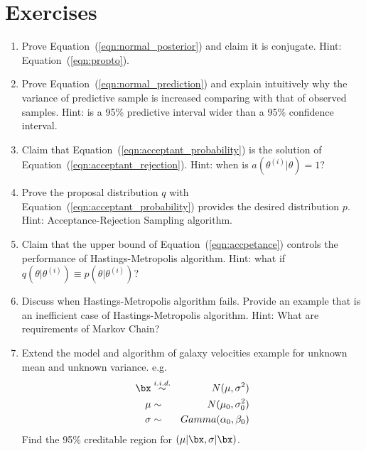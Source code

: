 \section{Exercises}
\label{sec:bayes_exercise}

\begin{enumerate}[label=\thechapter-\arabic*]

\item
Prove Equation~(\ref{eqn:normal_posterior}) and claim it is conjugate.
{\color{blue} Hint: Equation~(\ref{eqn:propto}). }

\item
Prove Equation~(\ref{eqn:normal_prediction}) and explain intuitively why
the variance of predictive sample is increased comparing with that of
observed samples.
{\color{blue} Hint: is a 95\% predictive interval wider than a 95\% confidence
interval. }

\item
Claim that Equation~(\ref{eqn:acceptant_probability}) is the solution of
Equation~(\ref{eqn:acceptant_rejection}).
{\color{blue} Hint: when is $a(\theta^{(i)} | \theta) = 1$? }

\item
Prove the proposal distribution $q$ with
Equation~(\ref{eqn:acceptant_probability}) provides the desired
distribution $p$.
{\color{blue} Hint: Acceptance-Rejection Sampling algorithm. }

\item
Claim that the upper bound of Equation~(\ref{eqn:accpetance}) controls
the performance of Hastings-Metropolis algorithm.
{\color{blue} Hint: what if
$q(\theta | \theta^{(i)}) \equiv p(\theta | \theta^{(i)})$? }

\item
Discuss when Hastings-Metropolis algorithm fails. Provide an example
that is an inefficient case of Hastings-Metropolis algorithm.
{\color{blue} Hint: What are requirements of Markov Chain? }

\item
Extend the model and algorithm of galaxy velocities example
for unknown mean and unknown variance. e.g.
\begin{eqnarray*}
\bx & \stackrel{i.i.d.}{\sim} & N(\mu, \sigma^2) \\
\mu & \sim & N(\mu_0, \sigma_0^2) \\
\sigma & \sim & Gamma(\alpha_0, \beta_0)
\end{eqnarray*}
Find the 95\% creditable region for $(\mu|\bx, \sigma|\bx)$.


\end{enumerate}

